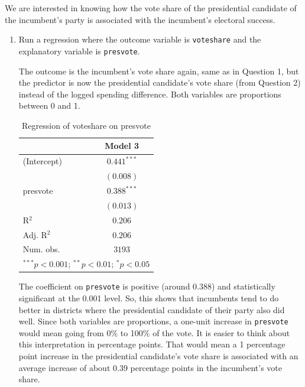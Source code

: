 \documentclass[12pt,letterpaper]{article}
\begin{document}
\noindent We are interested in knowing how the vote share of the presidential candidate of the incumbent's party is associated with the incumbent's electoral success.
	\vspace{.25cm}
	\begin{enumerate}
		\item Run a regression where the outcome variable is \texttt{voteshare} and the explanatory variable is \texttt{presvote}.
		
		\noindent The outcome is the incumbent's vote share again, same as in Question 1, but the predictor is now the presidential candidate's vote share (from Question 2) instead of the logged spending difference. Both variables are proportions between 0 and 1.
		
		
		
		\begin{table} [H]
			\begin{center}
				\begin{tabular}{l c}
					\hline
					& Model 3 \\
					\hline
					(Intercept) & $0.441^{***}$ \\
					& $(0.008)$     \\
					presvote    & $0.388^{***}$ \\
					& $(0.013)$     \\
					\hline
					R$^2$       & $0.206$       \\
					Adj. R$^2$  & $0.206$       \\
					Num. obs.   & $3193$        \\
					\hline
					\multicolumn{2}{l}{\scriptsize{$^{***}p<0.001$; $^{**}p<0.01$; $^{*}p<0.05$}}
				\end{tabular}
				\caption{Regression of voteshare on presvote}
				\label{table:model3}
			\end{center}
		\end{table}
		
		\noindent The coefficient on \texttt{presvote} is positive (around 0.388) and statistically significant at the 0.001 level. So, this shows that incumbents tend to do better in districts where the presidential candidate of their party also did well. Since both variables are proportions, a one-unit increase in \texttt{presvote} would mean going from 0\% to 100\% of the vote. It is easier to think about this interpretation in percentage points. That would mean a 1 percentage point increase in the presidential candidate's vote share is associated with an average increase of about 0.39 percentage points in the incumbent's vote share.
		

\end{enumerate}
\end{document}
